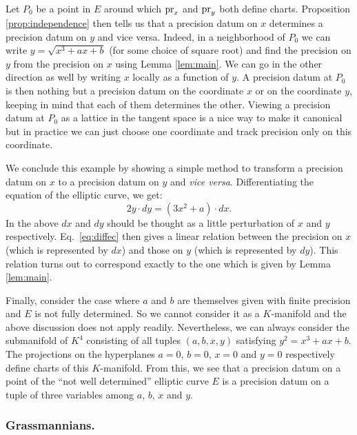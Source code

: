 \documentclass{lms}
\begin{document}
Let $P_0$ be a point in $E$ around which $\text{\rm pr}_x$ and $\text{\rm pr}_y$ both define 
charts. Proposition \ref{prop:independence} then tells us that a 
precision datum on $x$ determines a precision datum on $y$ and vice 
versa. Indeed, in a neighborhood of $P_0$ we can write $y = \sqrt{x^3 + a x + b}$ 
(for some choice of square root) and find the 
precision on $y$ from the precision on $x$ using Lemma \ref{lem:main}. We can go 
in the other direction as well by writing $x$ locally as a function of 
$y$. A precision datum at $P_0$ is then nothing but a precision datum
on the coordinate $x$ or on the coordinate $y$, keeping in mind that 
each of them determines the other. Viewing a precision datum at $P_0$ as 
a lattice in the tangent space is a nice way to make it canonical but in 
practice we can just choose one coordinate and track precision
only on this coordinate.

We conclude this example by showing a simple method to transform a
precision datum on $x$ to a precision datum on $y$ and \emph{vice versa}.
Differentiating the equation of the elliptic curve, we get:
\begin{equation}
\label{eq:diffec}
2 y \cdot dy = (3 x^2 + a) \cdot dx.
\end{equation}
In the above $dx$ and $dy$ should be thought as a little perturbation of 
$x$ and $y$ respectively. Eq.~\eqref{eq:diffec} then gives a linear 
relation between the precision on $x$ (which is represented by $dx$) and 
those on $y$ (which is represented by $dy$). This relation turns out to
correspond exactly to the one which is given by Lemma \ref{lem:main}.

Finally, consider the case where $a$ and $b$ are themselves given with 
finite precision and $E$ is not fully determined. So 
we cannot consider it as a $K$-manifold and the above discussion does not 
apply readily. Nevertheless, we can always consider the submanifold of 
$K^4$ consisting of all tuples $(a,b,x,y)$ satisfying $y^2 = x^3 + a x + 
b$. The projections on the hyperplanes $a = 0$, $b = 0$, $x = 0$ and $y = 
0$ respectively define charts of this $K$-manifold. From this, we see 
that a precision datum on a point of the ``not well determined'' elliptic 
curve $E$ is a precision datum on a tuple of three variables among $a$, 
$b$, $x$ and $y$.

\subsubsection*{Grassmannians.}
\end{document}
